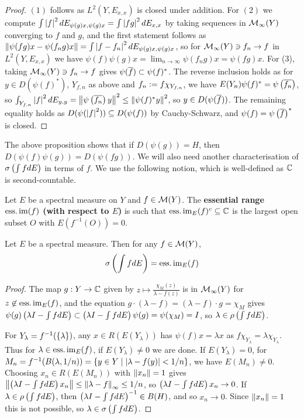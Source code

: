 \documentclass[10pt]{amsart}
\begin{document}
\begin{proof}
    $(1)$ follows as $L^2(Y, E_{x, x})$ is closed under addition. For $(2)$ we compute $\int\left| f \right|^2 dE_{\psi(g)x, \psi(g)x} = \int\left| fg \right|^2 dE_{x, x}$ by taking sequences in $\mathcal{M}_\infty(Y)$ converging to $f$ and $g$, and the first statement follows as $\left\| \psi(fg)x - \psi(f_ng)x \right\| = \int\left| f - f_n \right|^2dE_{\psi(g)x, \psi(g)x}$, so for $\mathcal{M}_\infty(Y) \ni f_n \to f$ in $L^2(Y, E_{x, x})$ we have $\psi(f)\psi(g)x = \lim_{n \to \infty}\psi(f_n g)x = \psi(fg)x$. For (3), taking $\mathcal{M}_\infty(Y) \ni f_n \to f$ gives $\psi(\overline{f}) \subset \psi(f)^*$. The reverse inclusion holds as for $y \in D(\psi(f)^*)$, $Y_{f, n}$ as above and $f_n \vcentcolon= f\chi_{Y_{f, n}}$, we have $E(Y_n)\psi(f)^* = \psi\left(  \overline{f_n}  \right)$, so $\int_{Y_{f, n}}\left| f \right|^2 dE_{y, y} = \left\| \psi\left(  \overline{f_n}  \right)y \right\|^2 \leq \left\| \psi(f)^*y \right\|^2$, so $y \in D(\psi(\overline{f}))$. The remaining equality holds as $D(\psi(\left| f \right|^2)) \subseteq D(\psi(f))$ by Cauchy-Schwarz, and $\psi(f) = \psi\left(  \overline{f}  \right)^*$ is closed.
\end{proof}
The above proposition shows that if $D(\psi(g)) = H$, then $D(\psi(f)\psi(g)) = D(\psi(fg))$. We will also need another characterisation of $\sigma\left(  \int f dE  \right)$ in terms of $f$. We use the following notion, which is well-defined as $\mathbb{C}$ is second-countable.
\begin{definition}
    Let $E$ be a spectral measure on $Y$ and $f \in \mathcal{M}(Y)$. The \textbf{essential range $\operatorname{ess.im}(f)$ (with respect to $E$)} is such that $\operatorname{ess.im}_E(f)^c \subseteq \mathbb{C}$ is the largest open subset $O$ with $E(f^{-1}(O)) = 0$.
\end{definition} %
\begin{proposition}\label{essimspec} %
    Let $E$ be a spectral measure. Then for any $f \in \mathcal{M}(Y)$,
    $$
        \sigma\left(  \int f dE  \right) = \operatorname{ess.im}_E(f)
    $$
\end{proposition}
\begin{proof}
    The map $g : Y \to \mathbb{C}$ given by $z \mapsto \frac{\chi_M(z)}{\lambda - f(z)}$ is in $\mathcal{M}_\infty(Y)$ for $z \not\in \operatorname{ess.im}_E(f)$, and the equation $g \cdot (\lambda - f) = (\lambda - f) \cdot g = \chi_M$ gives $\psi(g)\left(  \lambda I - \int f dE  \right) \subset \left(  \lambda I - \int f dE  \right)\psi(g) = \psi(\chi_M) = I$, so $\lambda \in \rho\left(  \int f dE  \right)$. 
    
    For $Y_\lambda = f^{-1}(\left\{  \lambda  \right\})$, any $x \in R(E(Y_\lambda))$ has $\psi(f)x = \lambda x$ as $f\chi_{Y_\lambda} = \lambda\chi_{Y_\lambda}$. Thus for $\lambda \in \operatorname{ess.im}_E(f)$, if $E(Y_\lambda) \neq 0$ we are done. If $E(Y_\lambda) = 0$, for $M_n = f^{-1}(B(\lambda, 1/n)) = \left\{  y \in Y \mid \left| \lambda - f(y) \right| < 1/n  \right\}$, we have $E(M_n) \neq 0$. Choosing $x_n \in R(E(M_n))$ with $\left\| x_n \right\| = 1$ gives $\left\| \left(  \lambda I - \int f dE  \right) x_n \right\| \leq \left\| \lambda - f \right\|_\infty \leq 1/n$, so $\left(  \lambda I - \int f dE  \right)x_n \to 0$. If $\lambda \in \rho\left(  \int f dE  \right)$, then $\left(  \lambda I - \int f dE  \right)^{-1} \in B(H)$, and so $x_n \to 0$. Since $\left\| x_n \right\| = 1$ this is not possible, so $\lambda \in \sigma\left(  \int f dE  \right)$.
\end{proof}
\end{document}
